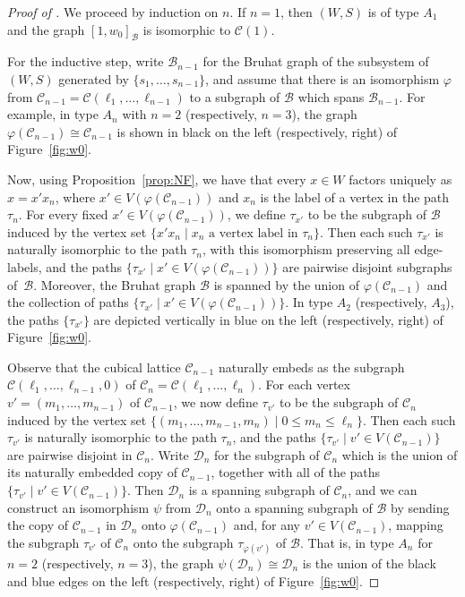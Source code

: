 \documentclass[11pt]{amsart}
\theoremstyle{plain}
\theoremstyle{definition}
\newcommand{\cC}{\mathcal{C}}
\newcommand{\cD}{\mathcal{D}}
\newcommand{\cB}{\mathcal B}
\numberwithin{equation}{subsection}
\begin{document}
\begin{proof}[Proof of ] We proceed by induction on $n$. If $n = 1$, then $(W,S)$ is of type $A_1$ and the graph $[1,w_0]_\cB$ is isomorphic to $\cC(1)$. 

For the inductive step, write $\cB_{n-1}$ for the Bruhat graph of the subsystem of $(W,S)$ generated by $\{ s_1, \dots, s_{n-1}\}$, and assume that there is an isomorphism $\varphi$ from $\cC_{n-1}= \cC(\ell_1, \dots, \ell_{n-1})$ to a subgraph of $\cB$ which spans $\cB_{n-1}$. 
 For example, in type $A_n$ with $n = 2$ (respectively, $n=3$), the graph $\varphi(\cC_{n-1})\cong \cC_{n-1}$ is shown in black on the left (respectively, right) of Figure~\ref{fig:w0}.

Now, using Proposition~\ref{prop:NF}, we have that every $x \in W$ factors uniquely as $x = x' x_n$, where $x' \in V(\varphi(\cC_{n-1}))$ and $x_n$ is the label of a vertex in the path $\tau_n$. For every fixed $x' \in V(\varphi(\cC_{n-1}))$, we define $\tau_{x'}$ to be the subgraph of $\cB$ induced by the vertex set $\{ x' x_n \mid x_n \mbox{ a vertex label in }\tau_n  \}$. Then each such $\tau_{x'}$ is naturally isomorphic to the path $\tau_n$, with this isomorphism preserving all edge-labels, and the paths $\{ \tau_{x'} \mid x' \in V(\varphi(\cC_{n-1})) \}$ are pairwise disjoint subgraphs of~$\cB$.  Moreover, the Bruhat graph $\cB$ is spanned by the union of $\varphi(\cC_{n-1})$ and the collection of paths $\{ \tau_{x'} \mid x' \in V(\varphi(\cC_{n-1})) \}$. In type $A_2$ (respectively, $A_3$), the paths $\{\tau_{x'}\}$ are depicted vertically in blue on the left (respectively, right) of Figure~\ref{fig:w0}.

Observe that the cubical lattice $\cC_{n-1}$ naturally embeds as the subgraph $\cC(\ell_1,\dots,\ell_{n-1},0)$ of $\cC_n = \cC(\ell_1, \dots, \ell_{n})$. For each vertex $v' = (m_1, \dots, m_{n-1})$ of $\cC_{n-1}$, we now define $\tau_{v'}$ to be the subgraph of $\cC_n$ induced by the vertex set $\{ (m_1,\dots,m_{n-1},m_n) \mid 0 \leq m_n \leq \ell_n \}$. Then each such $\tau_{v'}$ is naturally isomorphic to the path $\tau_n$, and the paths $\{ \tau_{v'} \mid v' \in V(\cC_{n-1})\}$ are pairwise disjoint in $\cC_n$. Write $\cD_n$ for the subgraph of $\cC_n$ which is the union of its naturally embedded copy of $\cC_{n-1}$, together with all of the paths $\{ \tau_{v'} \mid v' \in V(\cC_{n-1})\}$. Then $\cD_n$ is a spanning subgraph of $\cC_n$, and we can construct an isomorphism $\psi$ from $\cD_n$ onto a spanning subgraph of $\cB$ by sending the copy of $\cC_{n-1}$ in $\cD_n$ onto $\varphi(\cC_{n-1})$ and, for any $v' \in V(\cC_{n-1})$, mapping the subgraph $\tau_{v'}$ of $\cC_n$ onto the subgraph $\tau_{\varphi(v')}$ of $\cB$. That is, in type $A_n$ for $n = 2$ (respectively, $n = 3$), the graph $\psi(\cD_n) \cong \cD_n$ is the union of the black and blue edges on the left (respectively, right) of Figure~\ref{fig:w0}.


\end{proof}
\end{document}
